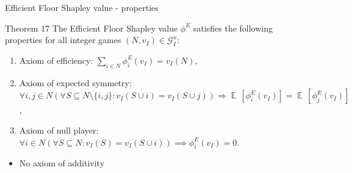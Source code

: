 \documentclass{beamer}
\DeclareMathOperator{\E}{\mathbb{E}\,}
\begin{document}
\begin{frame}{Efficient Floor Shapley value - properties}
    \pause

    \begin{block}{Theorem $17$}
        \pause
        The Efficient Floor Shapley value $\phi^E$ satisfies the following properties for all integer games $(N,v_I) \in \mathcal{G}_I^n$:
        \begin{enumerate}
            \pause
            \item Axiom of efficiency: $\sum_{i \in N}\phi_{i}^E(v_I) = v_I(N)$,
            \pause
            \item Axiom of expected symmetry: $\forall i,j \in N (\forall S \subseteq N \setminus \{i,j\}: v_I(S \cup i) = v_I(S \cup j)) \Rightarrow \E[\phi^E_{i}(v_I)] = \E[\phi^E_{j}(v_I)]$,
            \pause
            \item Axiom of null player: $\forall i \in N(\forall S \subseteq N: v_I(S)=v_I(S \cup i)) \implies \phi_{i}^E(v_I) = 0$.
        \end{enumerate}
    \end{block}

    \pause

    \begin{itemize}
        \item No axiom of additivity %
    \end{itemize}
\end{frame}


\end{document}
